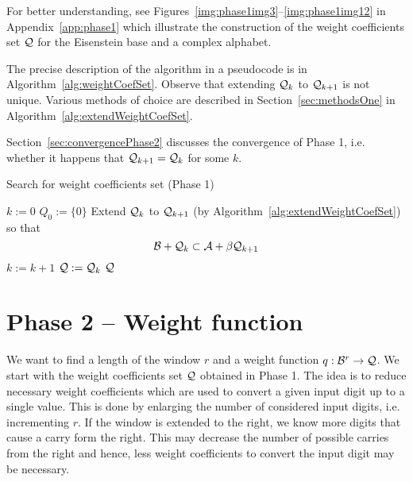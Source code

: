 For better understanding, see Figures~\ref{img:phase1img3}--\ref{img:phase1img12} in Appendix~\ref{app:phase1} which illustrate the construction of the weight coefficients set $\mathcal{Q}$ for the Eisenstein base and a complex alphabet. 

The precise description of the algorithm in a pseudocode is in Algorithm~\ref{alg:weightCoefSet}. Observe that extending $\mathcal{Q}_k$ to $\mathcal{Q}_{k+1}$ is not unique. Various methods of choice are described in Section~\ref{sec:methodsOne} in Algorithm~\ref{alg:extendWeightCoefSet}.
    



Section~\ref{sec:convergencePhase2} discusses the convergence of Phase 1, i.e. whether it happens that  $\mathcal{Q}_{k+1}=\mathcal{Q}_k$ for some  $k$.
    
\begin{algorithm}
  \caption{Search for weight coefficients set (Phase 1)}
    \label{alg:weightCoefSet}
  \begin{algorithmic}[1]
    \STATE $k:=0$ 
    \STATE $Q_0:=\{0\}$
    \REPEAT
     \STATE Extend $\mathcal{Q}_k$ to $\mathcal{Q}_{k+1}$ (by Algorithm~\ref{alg:extendWeightCoefSet}) so that $$\mathcal{B}+ \mathcal{Q}_k \subset \mathcal{A} + \beta \mathcal{Q}_{k+1}$$
     \vspace{-20pt}
      \STATE  $k:=k+1$
      \STATE $\mathcal{Q}:=\mathcal{Q}_k$
    \RETURN $\mathcal{Q}$
  \end{algorithmic}
\end{algorithm}


    

  
    
    





\section{Phase 2 -- Weight function}
\label{subsec:phase2}
    We want to find a length of the window $r$ and a weight function $q:\mathcal{B}^{r} \to \mathcal{Q}$. We start with the weight coefficients set $\mathcal{Q}$ obtained in Phase 1. The idea is to reduce necessary weight coefficients which are used to convert a given input digit up to a single value. This is done by enlarging the number of considered input digits, i.e. incrementing $r$.  If the window is extended to the right, we know more digits that cause a carry form the right. This may decrease the number of  possible carries from the right and hence, less weight coefficients to convert the input digit may be necessary.
     
